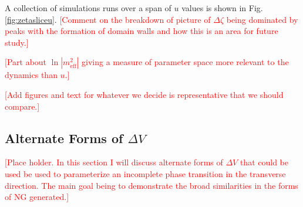 A collection of simulations runs over a span of $u$ values is shown in Fig. \ref{fig:zetasliceu}.
\textcolor{red}{[Comment on the breakdown of picture of $\Delta\zeta$ being dominated by peaks with the formation of domain walls and how this is an area for future study.]}

\Fzetaslicecomp

\Fpotparamcomp

\textcolor{red}{[Part about $\ln|m^2_\mathrm{eff}|$ giving a measure of parameter space more relevant to the dynamics than $u$.]}

\textcolor{red}{[Add figures and text for whatever we decide is representative that we should compare.]}





\subsection{Alternate Forms of $\Delta V$}
\textcolor{red}{[Place holder. In this section I will discuss alternate forms of $\Delta V$ that could be used be used to parameterize an incomplete phase transition in the transverse direction. The main goal being to demonstrate the broad similarities in the forms of NG generated.]}

